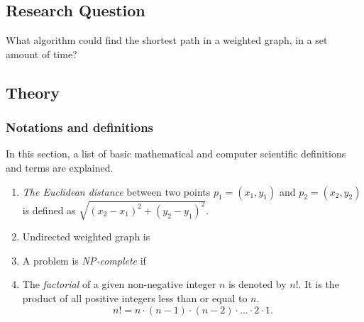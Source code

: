 \documentclass{article}
\begin{document}
\subsection{Research Question}\label{RQ}
What algorithm could find the shortest path in a weighted graph, in a set amount of time?



\subsection{Theory}\label{Theory}

\subsubsection{Notations and definitions}\label{Notation and definitions}

In this section, a list of basic mathematical and computer scientific definitions and terms are explained. 
\newline

\begin{enumerate}   %
 
  \item \textit{The Euclidean distance} between two points $p_1=(x_1,y_1)$ and $p_2=(x_2,y_2)$ is defined as $\sqrt{(x_2-x_1)^2+(y_2-y_1)^2}$. \label{Euclidean distance}
  \item Undirected weighted graph is \label{undirected weighted graph}
  \item A problem is \textit{NP-complete} if \label{NP-complete}
  \item The \textit{factorial} of a given non-negative integer $n$ is denoted by $n!$. It is the product of all positive integers less than or equal to $n$. $$n! = n \cdot (n-1) \cdot (n-2) \cdot ... \cdot 2 \cdot 1 .$$\label{factorial}
\end{enumerate}
\end{document}
